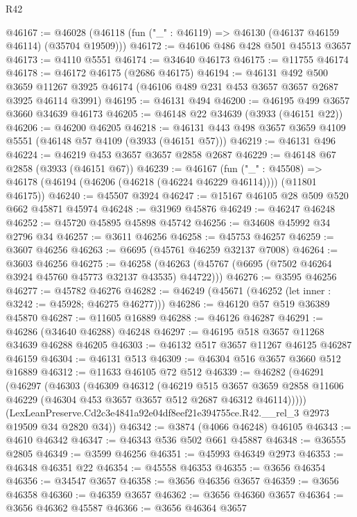 \begin{lexlean}{R42}
\begin{coremodule}
@46167 := @46028 (@46118 (fun ("_" : @46119) => @46130 (@46137 @46159 @46114) (@35704 @19509)))
@46172 := @46106 @486 @428 @501 @45513 @3657
@46173 := @4110 @5551
@46174 := @34640 @46173
@46175 := @11755 @46174
@46178 := @46172 @46175 (@2686 @46175)
@46194 := @46131
    @492
    @500
    @3659
    @11267
    @3925
    @46174
    (@46106 @489 @231 @453 @3657 @3657 @2687 @3925 @46114 @3991)
@46195 := @46131 @494
@46200 := @46195 @499 @3657 @3660 @34639 @46173
@46205 := @46148 @22 @34639 (@3933 (@46151 @22))
@46206 := @46200 @46205
@46218 := @46131 @443 @498 @3657 @3659 @4109 @5551 (@46148 @57 @4109 (@3933 (@46151 @57)))
@46219 := @46131 @496
@46224 := @46219 @453 @3657 @3657 @2858 @2687
@46229 := @46148 @67 @2858 (@3933 (@46151 @67))
@46239 := @46167
    (fun ("_" : @45508) => @46178 (@46194 (@46206 (@46218 (@46224 @46229 @46114)))) (@11801 @46175))
@46240 := @45507 @3924
@46247 := @15167 @46105 @28 @509 @520 @662 @45871 @45974
@46248 := @31969 @45876
@46249 := @46247 @46248
@46252 := @45720 @45895 @45898 @45742
@46256 := @34608 @45992 @34 @2796 @34
@46257 := @3611 @46256
@46258 := @45753 @46257
@46259 := @3607 @46256
@46263 := @6695 (@45761 @46259 @32137 @7008)
@46264 := @3603 @46256
@46275 := @46258 (@46263 (@45767 (@6695 (@7502 @46264 @3924 @45760 @45773 @32137 @43535) @44722)))
@46276 := @3595 @46256
@46277 := @45782 @46276
@46282 := @46249 (@45671 (@46252 (let inner : @3242 := @45928; @46275 @46277)))
@46286 := @46120 @57 @519 @36389 @45870
@46287 := @11605 @16889
@46288 := @46126 @46287
@46291 := @46286 (@34640 @46288) @46248
@46297 := @46195 @518 @3657 @11268 @34639 @46288 @46205
@46303 := @46132 @517 @3657 @11267 @46125 @46287 @46159
@46304 := @46131 @513
@46309 := @46304 @516 @3657 @3660 @512 @16889
@46312 := @11633 @46105 @72 @512
@46339 := @46282
    (@46291
      (@46297
        (@46303
          (@46309
            @46312
            (@46219
              @515
              @3657
              @3659
              @2858
              @11606
              @46229
              (@46304 @453 @3657 @3657 @512 @2687 @46312 @46114)))))
      (LexLeanPreserve.Cd2c3e4841a92e04df8eef21e394755ce.R42.__rel_3 @2973 @19509 @34 @2820 @34))
@46342 := @3874 (@4066 @46248) @46105
@46343 := @4610 @46342
@46347 := @46343 @536 @502 @661 @45887
@46348 := @36555 @2805
@46349 := @3599 @46256
@46351 := @45993 @46349 @2973
@46353 := @46348 @46351 @22
@46354 := @45558 @46353
@46355 := @3656 @46354
@46356 := @34547 @3657
@46358 := @3656 @46356 @3657
@46359 := @3656 @46358
@46360 := @46359 @3657
@46362 := @3656 @46360 @3657
@46364 := @3656 @46362 @45587
@46366 := @3656 @46364 @3657

\end{coremodule}
\end{lexlean}
